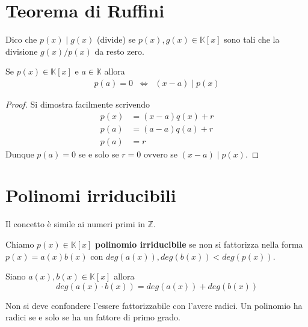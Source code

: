 \section{Teorema di Ruffini}
\begin{defn}
	Dico che $p(x) \mid g(x)$ (divide) se $p(x), g(x) \in \mathbb{K}[x]$ sono tali che
	la divisione $g(x) / p(x)$ da resto zero.
\end{defn}

\begin{theorem}
	Se $p(x) \in \mathbb{K}[x]$ e $a \in \mathbb{K}$ allora
	\begin{equation*}
		\begin{array}{ccc}
			p(a) = 0 & \Leftrightarrow & (x - a) \mid p(x)
		\end{array}
	\end{equation*}
	\begin{proof}
		Si dimostra facilmente scrivendo
		\begin{equation*}
			\begin{array}{ll}
				p(x) & = (x - a) q(x) + r \\
				p(a) & = (a - a) q(a) + r \\
				p(a) & = r
			\end{array}
		\end{equation*}
		Dunque $p(a) = 0$ se e solo se $r = 0$ ovvero se $(x - a) \mid p(x)$.
	\end{proof}
\end{theorem}

\section{Polinomi irriducibili}
Il concetto \`e simile ai numeri primi in $\mathbb{Z}$.

\begin{defn}
	Chiamo $p(x) \in \mathbb{K}[x]$ \textbf{polinomio irriducibile} se non si fattorizza nella
	forma $p(x) = a(x)b(x)$ con $deg(a(x)), deg(b(x)) < deg(p(x))$.
\end{defn}

\begin{observation}
	Siano $a(x), b(x) \in \mathbb{K}[x]$ allora
	\begin{equation*}
		deg(a(x) \cdot b(x)) = deg(a(x)) + deg(b(x))
	\end{equation*}
\end{observation}

\begin{observation}
	Non si deve confondere l'essere fattorizzabile con l'avere radici. Un polinomio ha
	radici se e solo se ha un fattore di primo grado.
\end{observation}

